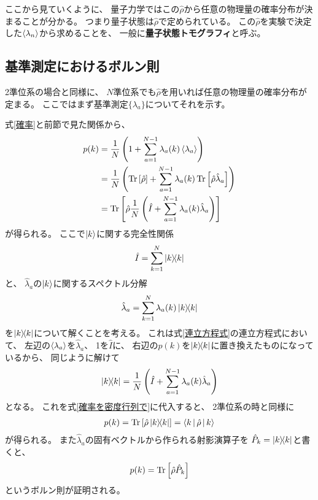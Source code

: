 \documentclass[a4paper, 10pt]{jsarticle}
\begin{document}
ここから見ていくように、
量子力学ではこの$\hat{\rho}$から任意の物理量の確率分布が決まることが分かる。
つまり量子状態は$\hat{\rho}$で定められている。
この$\hat{\rho}$を実験で決定した$\Braket{\lambda_n}$から求めることを、
一般に\textbf{量子状態トモグラフィ}と呼ぶ。

\subsection{基準測定におけるボルン則}
2準位系の場合と同様に、
$N$準位系でも$\hat{\rho}$を用いれば任意の物理量の確率分布が定まる。
ここではまず基準測定$\{ \lambda_a \}$についてそれを示す。

式\eqref{確率}と前節で見た関係から、
\begin{align}
	p(k) &= \frac{1}{N} \left(
		1 + \sum_{a=1}^{N-1} \lambda_a (k) \Braket{\lambda_a}
	\right) \\
	&= \frac{1}{N} \left(
		\operatorname*{Tr} \left[ \hat{\rho} \right]
		+ \sum_{a=1}^{N-1} \lambda_a (k)
		\operatorname*{Tr} \left[ \hat{\rho} \hat{\lambda}_a \right]
	\right) \\
	&= \operatorname*{Tr} \left[ \hat{\rho} \frac{1}{N} \left(
		\hat{I} + \sum_{a=1}^{N-1} \lambda_a (k) \hat{\lambda}_a
	\right) \right] \label{確率を密度行列で}
\end{align}
が得られる。
ここで$\Ket{k}$に関する完全性関係
\begin{align}
	\hat{I} = \sum_{k=1}^{N} \Ket{k} \! \! \Bra{k}
\end{align}
と、
$\hat{\lambda}_a$の$\Ket{k}$に関するスペクトル分解
\begin{align}
	\hat{\lambda}_a = \sum_{k=1}^N \lambda_a (k) \Ket{k} \! \! \Bra{k}
\end{align}
を$\Ket{k} \! \! \Bra{k}$について解くことを考える。
これは式\eqref{連立方程式}の連立方程式において、
左辺の$\Braket{\lambda_a}$を$\hat{\lambda}_a$、
1を$\hat{I}$に、
右辺の$p(k)$を$\Ket{k} \! \! \Bra{k}$に置き換えたものになっているから、
同じように解けて
\begin{align}
	\Ket{k} \! \! \Bra{k} = \frac{1}{N} \left( \hat{I}
	+ \sum_{a=1}^{N-1} \lambda_a (k) \hat{\lambda}_a \right)
\end{align}
となる。
これを式\eqref{確率を密度行列で}に代入すると、
2準位系の時と同様に
\begin{align}
	p(k)
	= \operatorname*{Tr} \left[ \hat{\rho} \Ket{k} \! \! \Bra{k} \right]
	= \Braket{k | \hat{\rho} | k}
\end{align}
が得られる。
また$\hat{\lambda}_a$の固有ベクトルから作られる射影演算子を
$\hat{P}_k = \Ket{k} \! \! \Bra{k}$と書くと、
\begin{align}
	p(k) = \operatorname*{Tr} \left[ \hat{\rho} \hat{P}_k \right]
\end{align}
というボルン則が証明される。
\end{document}
